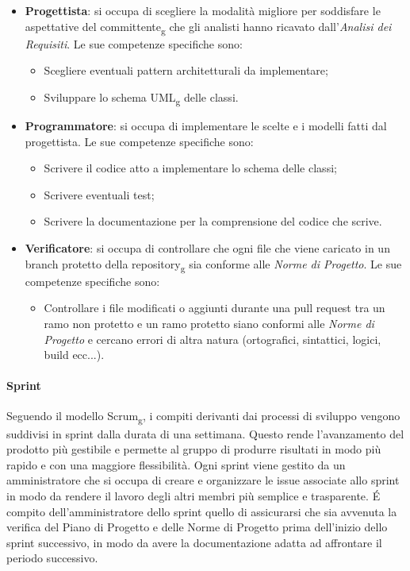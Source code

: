 \begin{itemize}
\item \textbf{Progettista}: si occupa di scegliere la modalità migliore per soddisfare le aspettative del committente\textsubscript{g} che gli analisti hanno ricavato dall'\textit{Analisi dei Requisiti}. Le sue competenze specifiche sono:
\begin{itemize}
	\item Scegliere eventuali pattern architetturali da implementare;
	\item Sviluppare lo schema UML\textsubscript{g} delle classi.
\end{itemize}

\item \textbf{Programmatore}: si occupa di implementare le scelte e i modelli fatti dal progettista. Le sue competenze specifiche sono:
\begin{itemize}
	\item Scrivere il codice atto a implementare lo schema delle classi;
	\item Scrivere eventuali test;
	\item Scrivere la documentazione per la comprensione del codice che scrive.
\end{itemize}

\item \textbf{Verificatore}: si occupa di controllare che ogni file che viene caricato in un branch protetto della repository\textsubscript{g} sia conforme alle \textit{Norme di Progetto}. Le sue competenze specifiche sono:
\begin{itemize}
	\item Controllare i file modificati o aggiunti durante una pull request tra un ramo non protetto e un ramo protetto siano conformi alle \textit{Norme di Progetto} e cercano errori di altra natura (ortografici, sintattici, logici, build ecc...).
\end{itemize}

\end{itemize}

\paragraph{Sprint}
Seguendo il modello Scrum\textsubscript{g}, i compiti derivanti dai processi di sviluppo vengono suddivisi in sprint dalla durata di una settimana. \newline
Questo rende l'avanzamento del prodotto più gestibile e permette al gruppo di produrre risultati in modo più rapido e con una maggiore flessibilità. \newline
Ogni sprint viene gestito da un amministratore che si occupa di creare e organizzare le issue associate allo sprint in modo da rendere il lavoro degli altri membri più semplice e trasparente. \newline
É compito dell'amministratore dello sprint quello di assicurarsi che sia avvenuta la verifica del Piano di Progetto e delle Norme di Progetto prima dell'inizio dello sprint successivo, in modo da avere la documentazione adatta ad affrontare il periodo successivo. 